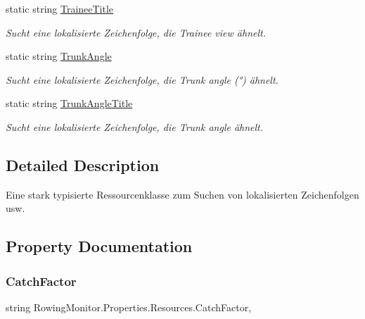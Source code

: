 \begin{DoxyCompactItemize}
static string \hyperlink{class_rowing_monitor_1_1_properties_1_1_resources_a0208603dd9c860960fd717afc0754559}{Trainee\+Title}
\begin{DoxyCompactList}\small\item\em Sucht eine lokalisierte Zeichenfolge, die Trainee view ähnelt. \end{DoxyCompactList}\item 
static string \hyperlink{class_rowing_monitor_1_1_properties_1_1_resources_acc2d7716003cd33c03211424dc63b7c9}{Trunk\+Angle}
\begin{DoxyCompactList}\small\item\em Sucht eine lokalisierte Zeichenfolge, die Trunk angle (°) ähnelt. \end{DoxyCompactList}\item 
static string \hyperlink{class_rowing_monitor_1_1_properties_1_1_resources_a8e28b98be3db69f55589b3fd45ef4afd}{Trunk\+Angle\+Title}
\begin{DoxyCompactList}\small\item\em Sucht eine lokalisierte Zeichenfolge, die Trunk angle ähnelt. \end{DoxyCompactList}\end{DoxyCompactItemize}


\subsection{Detailed Description}
Eine stark typisierte Ressourcenklasse zum Suchen von lokalisierten Zeichenfolgen usw. 



\subsection{Property Documentation}
\mbox{\label{class_rowing_monitor_1_1_properties_1_1_resources_a387e94c12ed72def984e5c51c268cf0a}} 
\subsubsection{\texorpdfstring{Catch\+Factor}{CatchFactor}}
{\footnotesize\ttfamily string Rowing\+Monitor.\+Properties.\+Resources.\+Catch\+Factor\hspace{0.3cm}{\ttfamily [static]}, {\ttfamily [get]}}



